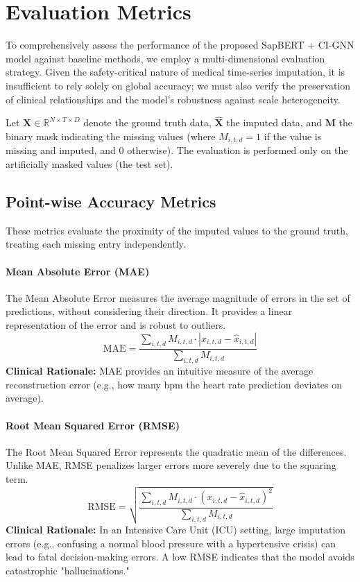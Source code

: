 
\section{Evaluation Metrics}

To comprehensively assess the performance of the proposed SapBERT + CI-GNN model against baseline methods, we employ a multi-dimensional evaluation strategy. Given the safety-critical nature of medical time-series imputation, it is insufficient to rely solely on global accuracy; we must also verify the preservation of clinical relationships and the model's robustness against scale heterogeneity.

Let $\mathbf{X} \in \mathbb{R}^{N \times T \times D}$ denote the ground truth data, $\hat{\mathbf{X}}$ the imputed data, and $\mathbf{M}$ the binary mask indicating the missing values (where $M_{i,t,d} = 1$ if the value is missing and imputed, and 0 otherwise). The evaluation is performed only on the artificially masked values (the test set).

\subsection{Point-wise Accuracy Metrics}

These metrics evaluate the proximity of the imputed values to the ground truth, treating each missing entry independently.

\paragraph{Mean Absolute Error (MAE)}
The Mean Absolute Error measures the average magnitude of errors in the set of predictions, without considering their direction. It provides a linear representation of the error and is robust to outliers.
\begin{equation}
    \text{MAE} = \frac{\sum_{i,t,d} M_{i,t,d} \cdot |x_{i,t,d} - \hat{x}_{i,t,d}|}{\sum_{i,t,d} M_{i,t,d}}
\end{equation}
\textbf{Clinical Rationale:} MAE provides an intuitive measure of the average reconstruction error (e.g., how many bpm the heart rate prediction deviates on average).

\paragraph{Root Mean Squared Error (RMSE)}
The Root Mean Squared Error represents the quadratic mean of the differences. Unlike MAE, RMSE penalizes larger errors more severely due to the squaring term.
\begin{equation}
    \text{RMSE} = \sqrt{\frac{\sum_{i,t,d} M_{i,t,d} \cdot (x_{i,t,d} - \hat{x}_{i,t,d})^2}{\sum_{i,t,d} M_{i,t,d}}}
\end{equation}
\textbf{Clinical Rationale:} In an Intensive Care Unit (ICU) setting, large imputation errors (e.g., confusing a normal blood pressure with a hypertensive crisis) can lead to fatal decision-making errors. A low RMSE indicates that the model avoids catastrophic "hallucinations."

